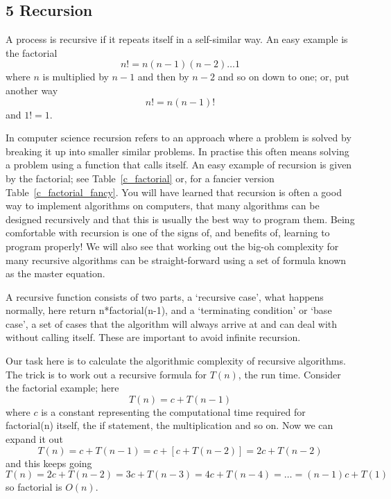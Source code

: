 \documentclass[11pt,a4paper]{scrartcl}
\begin{document}
\subsection*{5 Recursion}

A process is recursive if it repeats itself in a self-similar way. An
easy example is the factorial
\begin{equation}
n!=n(n-1)(n-2)\ldots 1
\end{equation}
where $n$ is multiplied by $n-1$ and then by $n-2$ and so on down to one; or, put another way
\begin{equation}
n!=n(n-1)!
\end{equation}
and $1!=1$.

In computer science recursion refers to an approach where a problem is
solved by breaking it up into smaller similar problems. In practise
this often means solving a problem using a function that calls
itself. An easy example of recursion is given by the factorial; see
Table~\ref{c_factorial} or, for a fancier version
Table~\ref{c_factorial_fancy}. You will have learned that recursion is
often a good way to implement algorithms on computers, that many
algorithms can be designed recursively and that this is usually the
best way to program them. Being comfortable with recursion is one of
the signs of, and benefits of, learning to program properly! We will
also see that working out the big-oh complexity for many recursive
algorithms can be straight-forward using a set of formula known as
the master equation.

A recursive function consists of two parts, a \lq{}recursive
case\rq{}, what happens normally, here return n*factorial(n-1), and a
\lq{}terminating condition\rq{} or \lq{}base case\rq{}, a set of cases
that the algorithm will always arrive at and can deal with without
calling itself. These are important to avoid infinite recursion.

Our task here is to calculate the algorithmic complexity of recursive
algorithms. The trick is to work out a recursive formula for $T(n)$,
the run time. Consider the factorial example; here
\begin{equation}
T(n)=c+T(n-1)
\end{equation}
where $c$ is a constant representing the computational time required
for factorial(n) itself, the if statement, the multiplication and so
on. Now we can expand it out
\begin{equation}
T(n)=c+T(n-1)=c+[c+T(n-2)]=2c+T(n-2)
\end{equation}
and this keeps going
\begin{equation}
T(n)=2c+T(n-2)=3c+T(n-3)=4c+T(n-4)=\ldots = (n-1)c+T(1)
\end{equation}
so factorial is $O(n)$. 
\end{document}
